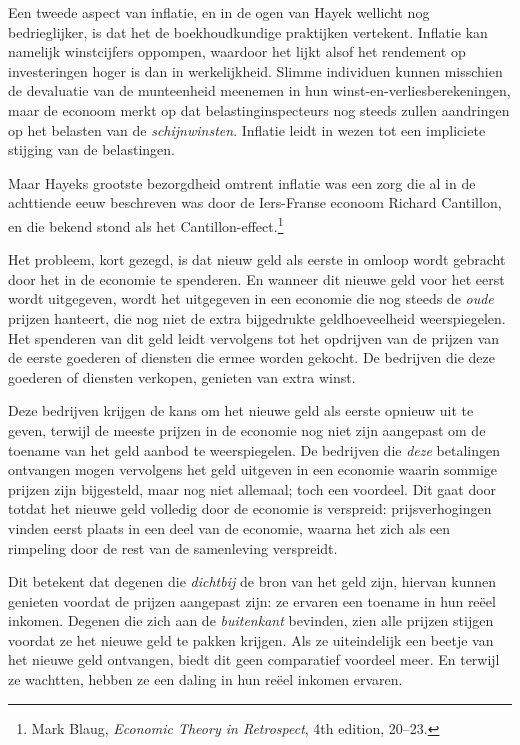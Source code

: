 \documentclass[
  a5paper,
  smalldemyvopaper,11pt,twoside,onecolumn,openright,extrafontsizes,
hidelinks]{memoir}
\begin{document}
Een tweede aspect van inflatie, en in de ogen van Hayek wellicht nog
bedrieglijker, is dat het de boekhoudkundige praktijken vertekent.
Inflatie kan namelijk winstcijfers oppompen, waardoor het lijkt alsof
het rendement op investeringen hoger is dan in werkelijkheid. Slimme
individuen kunnen misschien de devaluatie van de munteenheid meenemen in
hun winst-en-verliesberekeningen, maar de econoom merkt op dat
belastinginspecteurs nog steeds zullen aandringen op het belasten van de
\emph{schijnwinsten}. Inflatie leidt in wezen tot een impliciete
stijging van de belastingen.

Maar Hayeks grootste bezorgdheid omtrent inflatie was een zorg die al in
de achttiende eeuw beschreven was door de Iers-Franse econoom Richard
Cantillon, en die bekend stond als het Cantillon-effect.\footnote{\hspace{0pt}Mark
  Blaug, \emph{Economic Theory in Retrospect}, 4th edition, 20--23.}

Het probleem, kort gezegd, is dat nieuw geld als eerste in omloop wordt
gebracht door het in de economie te spenderen. En wanneer dit nieuwe
geld voor het eerst wordt uitgegeven, wordt het uitgegeven in een
economie die nog steeds de \emph{oude} prijzen hanteert, die nog niet de
extra bijgedrukte geldhoeveelheid weerspiegelen. Het spenderen van dit
geld leidt vervolgens tot het opdrijven van de prijzen van de eerste
goederen of diensten die ermee worden gekocht. De bedrijven die deze
goederen of diensten verkopen, genieten van extra winst.

Deze bedrijven krijgen de kans om het nieuwe geld als eerste opnieuw uit
te geven, terwijl de meeste prijzen in de economie nog niet zijn
aangepast om de toename van het geld aanbod te weerspiegelen. De
bedrijven die \emph{deze} betalingen ontvangen mogen vervolgens het geld
uitgeven in een economie waarin sommige prijzen zijn bijgesteld, maar
nog niet allemaal; toch een voordeel. Dit gaat door totdat het nieuwe
geld volledig door de economie is verspreid: prijsverhogingen vinden
eerst plaats in een deel van de economie, waarna het zich als een
rimpeling door de rest van de samenleving verspreidt.

Dit betekent dat degenen die \emph{dichtbij} de bron van het geld zijn,
hiervan kunnen genieten voordat de prijzen aangepast zijn: ze ervaren
een toename in hun reëel inkomen. Degenen die zich aan de
\emph{buitenkant} bevinden, zien alle prijzen stijgen voordat ze het
nieuwe geld te pakken krijgen. Als ze uiteindelijk een beetje van het
nieuwe geld ontvangen, biedt dit geen comparatief voordeel meer. En
terwijl ze wachtten, hebben ze een daling in hun reëel inkomen ervaren.
\end{document}
